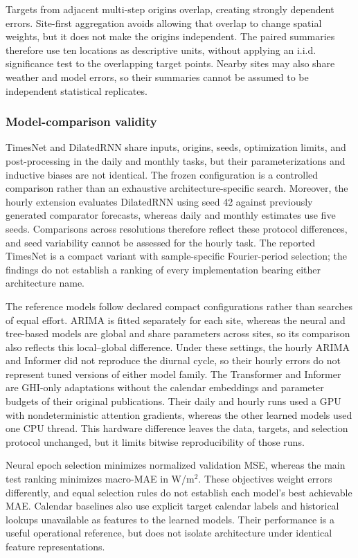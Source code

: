 Targets from adjacent multi-step origins overlap, creating strongly dependent
errors. Site-first aggregation avoids allowing that overlap to change spatial
weights, but it does not make the origins independent. The paired summaries
therefore use ten locations as descriptive units, without applying an
i.i.d. significance test to the overlapping target points. Nearby sites may
also share weather and model errors, so their summaries cannot be assumed
to be independent statistical replicates.

\subsubsection{Model-comparison validity}

TimesNet and DilatedRNN share inputs, origins, seeds, optimization limits, and
post-processing in the daily and monthly tasks, but their parameterizations and
inductive biases are not identical. The frozen configuration is a controlled
comparison rather than an exhaustive architecture-specific search. Moreover,
the hourly extension evaluates DilatedRNN using seed 42 against previously
generated comparator forecasts, whereas daily and monthly estimates use five
seeds. Comparisons across resolutions therefore reflect these protocol
differences, and seed variability cannot be assessed for the hourly task.
The reported TimesNet is a compact variant with sample-specific Fourier-period
selection; the findings do not establish a ranking of every implementation
bearing either architecture name.

The reference models follow declared compact configurations rather than
searches of equal effort. ARIMA is fitted separately for each site, whereas
the neural and tree-based models are global and share parameters across
sites, so its comparison also reflects this local--global difference.
Under these settings, the hourly ARIMA and Informer did not reproduce the
diurnal cycle, so their hourly errors do not represent tuned versions of
either model family. The
Transformer and Informer are GHI-only adaptations without the calendar
embeddings and parameter budgets of their original publications. Their daily
and hourly runs used a GPU with nondeterministic attention gradients, whereas
the other learned models used one CPU thread. This hardware difference leaves
the data, targets, and selection protocol unchanged, but it limits bitwise
reproducibility of those runs.

Neural epoch selection minimizes normalized validation MSE, whereas the main
test ranking minimizes macro-MAE in W/m$^2$. These objectives weight errors
differently, and equal selection rules do not establish each model's best
achievable MAE. Calendar baselines also use explicit target calendar labels
and historical lookups unavailable as features to the learned models. Their
performance is a useful operational reference, but does not isolate
architecture under identical feature representations.

